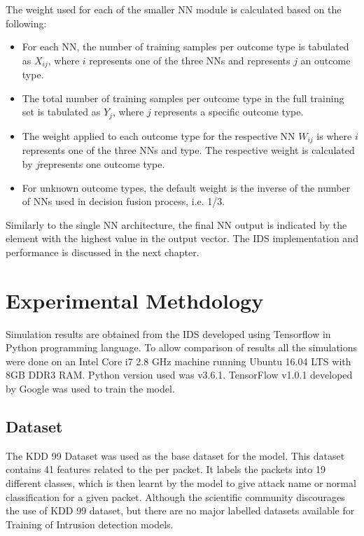\documentclass[12pt]{article}
\theoremstyle{definition}
\begin{document}
			The weight used for each of the smaller NN module is calculated based on the following:
			
			\begin{itemize}
				\item For each NN, the number of training samples per outcome type is
				tabulated as $X_{ij} $, where $ i $ represents one of the three NNs and represents $ j $ an outcome type.
				
				\item The total number of training samples per outcome type in the full training
				set is tabulated as $ Y_j $, where $ j $ represents a specific outcome type.
				
				\item The weight applied to each outcome type for the respective NN $ W_{ij} $ is
				where $ i $ represents one of the three NNs and type. The respective weight is calculated by $ j $represents one outcome type.
				\item For unknown outcome types, the default weight is the inverse of the
				number of NNs used in decision fusion process, i.e. 1/3.
			\end{itemize}
		
		Similarly to the single NN architecture, the final NN output is indicated by the
		element with the highest value in the output vector. The IDS implementation and performance is discussed in the next chapter.
	
	
	\cleardoublepage
	\section{Experimental Methdology}
	Simulation results are obtained from the IDS developed using Tensorflow in Python programming language. To allow comparison of results all the simulations were done on an Intel Core i7 2.8 GHz machine running Ubuntu 16.04 LTS with 8GB DDR3 RAM. Python version used was v3.6.1. TensorFlow v1.0.1 developed by Google was used to train the model.
		\subsection{Dataset}
		The KDD 99 Dataset was used as the base dataset for the model. This dataset contains 41 features related to the per packet. It labels the packets into 19 different classes, which is then learnt by the model to give attack name or normal classification for a given packet. Although the scientific community discourages the use of KDD 99 dataset, but there are no major labelled datasets available for Training of Intrusion detection models.
		
\end{document}

